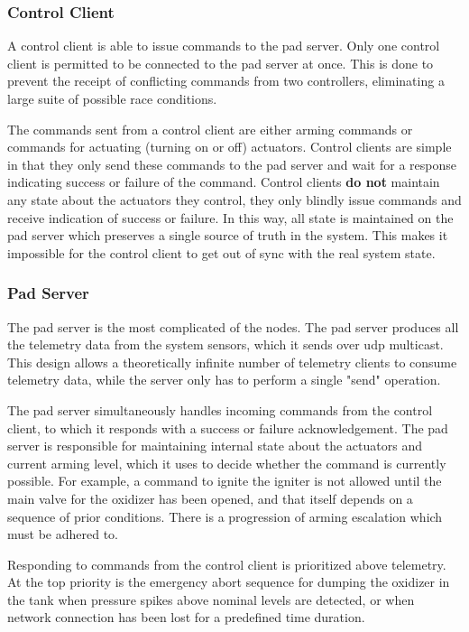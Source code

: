 \subsubsection{Control Client}

A control client is able to issue commands to the pad server. Only one control client is permitted to be connected to
the pad server at once. This is done to prevent the receipt of conflicting commands from two controllers, eliminating a
large suite of possible race conditions.

The commands sent from a control client are either arming commands or commands for actuating (turning on or off)
actuators. Control clients are simple in that they only send these commands to the pad server and wait for a response
indicating success or failure of the command. Control clients \textbf{do not} maintain any state about the actuators
they control, they only blindly issue commands and receive indication of success or failure. In this way, all state is
maintained on the pad server which preserves a single source of truth in the system. This makes it impossible for the
control client to get out of sync with the real system state.

\subsubsection{Pad Server}

The pad server is the most complicated of the nodes. The pad server produces all the telemetry data from the system
sensors, which it sends over \gls{udp} multicast. This design allows a theoretically infinite number of telemetry
clients to consume telemetry data, while the server only has to perform a single "send" operation.

The pad server simultaneously handles incoming commands from the control client, to which it responds with a success or
failure acknowledgement. The pad server is responsible for maintaining internal state about the actuators and current
arming level, which it uses to decide whether the command is currently possible. For example, a command to ignite the
igniter is not allowed until the main valve for the oxidizer has been opened, and that itself depends on a sequence of
prior conditions. There is a progression of arming escalation which must be adhered to.

Responding to commands from the control client is prioritized above telemetry. At the top priority is the emergency
abort sequence for dumping the oxidizer in the tank when pressure spikes above nominal levels are detected, or when
network connection has been lost for a predefined time duration.

